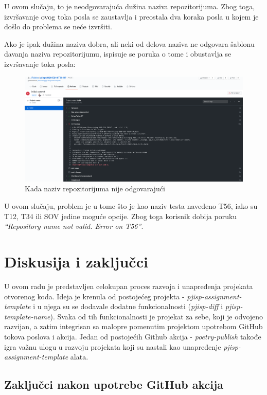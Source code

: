 \documentclass[12pt]{report}
\begin{document}
U ovom slučaju, to je neodgovarajuća dužina naziva repozitorijuma. Zbog toga, izvršavanje ovog toka posla se zaustavlja i preostala dva koraka posla u kojem je došlo do problema se neće izvršiti.

Ako je ipak dužina naziva dobra, ali neki od delova naziva ne odgovara šablonu davanja naziva repozitorijumu, ispisuje se poruka o tome i obustavlja se izvršavanje toka posla:

\begin{figure}[H]
    \centering
    \includegraphics[width=\linewidth]{images/20.png}
    \caption{Kada naziv repozitorijuma nije odgovarajući}
\end{figure}

U ovom slučaju, problem je u tome što je kao naziv testa navedeno T56, iako su T12, T34 ili SOV jedine moguće opcije. Zbog toga korisnik dobija poruku \textit{``Repository name not valid. Error on T56''}.

\chapter{Diskusija i zaključci}

U ovom radu je predstavljen celokupan proces razvoja i unapređenja projekata otvorenog koda. Ideja je krenula od postojećeg projekta - \textit{pjisp-assignment-template} i u njega su se dodavale dodatne funkcionalnosti (\textit{pjisp-diff} i \textit{pjisp-template-name}). Svaka od tih funkcionalnosti je projekat za sebe, koji je odvojeno razvijan, a zatim integrisan sa malopre pomenutim projektom upotrebom GitHub tokova poslova i akcija. Jedan od postojećih Github akcija - \textit{poetry-publish} takođe igra važnu ulogu u razvoju projekata koji su nastali kao unapređenje \textit{pjisp-assignment-template} alata.

\section{Zaključci nakon upotrebe GitHub akcija}
\end{document}

